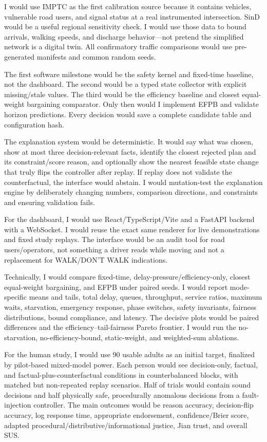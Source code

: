 \documentclass[
  english,
  11pt,
  a4paper,
]{article}
\begin{document}
I would use IMPTC as the first calibration source because it contains
vehicles, vulnerable road users, and signal status at a real
instrumented intersection. SinD would be a useful regional sensitivity
check. I would use those data to bound arrivals, walking speeds, and
discharge behavior---not pretend the simplified network is a digital
twin. All confirmatory traffic comparisons would use pre-generated
manifests and common random seeds.

The first software milestone would be the safety kernel and fixed-time
baseline, not the dashboard. The second would be a typed state collector
with explicit missing/stale values. The third would be the efficiency
baseline and closest equal-weight bargaining comparator. Only then would
I implement EFPB and validate horizon predictions. Every decision would
save a complete candidate table and configuration hash.

The explanation system would be deterministic. It would say what was
chosen, show at most three decision-relevant facts, identify the closest
rejected plan and its constraint/score reason, and optionally show the
nearest feasible state change that truly flips the controller after
replay. If replay does not validate the counterfactual, the interface
would abstain. I would mutation-test the explanation engine by
deliberately changing numbers, comparison directions, and constraints
and ensuring validation fails.

For the dashboard, I would use React/TypeScript/Vite and a FastAPI
backend with a WebSocket. I would reuse the exact same renderer for live
demonstrations and fixed study replays. The interface would be an audit
tool for road users/operators, not something a driver reads while moving
and not a replacement for WALK/DON'T WALK indications.

Technically, I would compare fixed-time, delay-pressure/efficiency-only,
closest equal-weight bargaining, and EFPB under paired seeds. I would
report mode-specific means and tails, total delay, queues, throughput,
service ratios, maximum waits, starvation, emergency response, phase
switches, safety invariants, fairness distributions, bound compliance,
and latency. The decisive plots would be paired differences and the
efficiency--tail-fairness Pareto frontier. I would run the
no-starvation, no-efficiency-bound, static-weight, and weighted-sum
ablations.

For the human study, I would use 90 usable adults as an initial target,
finalized by pilot-based mixed-model power. Each person would see
decision-only, factual, and factual-plus-counterfactual conditions in
counterbalanced blocks, with matched but non-repeated replay scenarios.
Half of trials would contain sound decisions and half physically safe,
procedurally anomalous decisions from a fault-injection controller. The
main outcomes would be reason accuracy, decision-flip accuracy, log
response time, appropriate endorsement, confidence/Brier score, adapted
procedural/distributive/informational justice, Jian trust, and overall
SUS.
\end{document}
